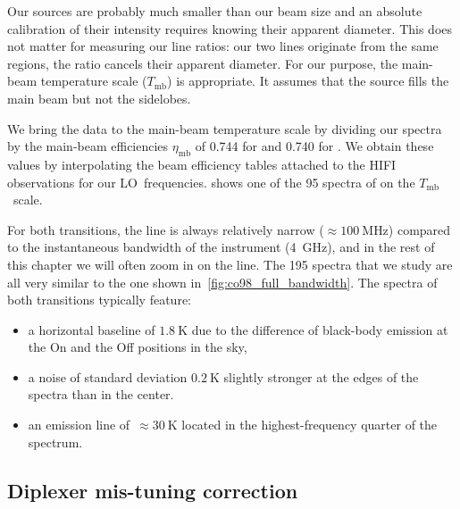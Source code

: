 Our sources are probably much smaller than our beam size and an absolute calibration of their intensity requires knowing their apparent diameter.
This does not matter for measuring our line ratios:
our two lines originate from the same regions, the ratio cancels their apparent diameter.
For our purpose, the main-beam temperature scale ($T_\text{mb}$) is appropriate.
It assumes that the source fills the main beam but not the sidelobes.

We bring the data to the main-beam temperature scale by dividing our spectra by the main-beam efficiencies $\eta_\text{mb}$ of
\num{0.744} for  and \num{0.740} for .
We obtain these values by interpolating the beam efficiency tables attached to the HIFI observations for our LO~frequencies.
 shows one of the 95 spectra of  on the $T_\text{mb}$~scale.

For both transitions, the  line is always relatively narrow ($\approx \SI{100}{\mega\hertz}$) compared to the instantaneous bandwidth of the instrument (\SI{4}{\giga\hertz}), and in the rest of this chapter we will often zoom in on the line.
The 195 spectra that we study are all very similar to the one shown in~\cref{fig:co98_full_bandwidth}.
The spectra of both transitions typically feature:
\begin{itemize}[noitemsep,nolistsep]
    \item a horizontal baseline of $\SI{1.8}{\kelvin}$ due to the difference of black-body emission at the On and the Off positions in the sky,
    \item a noise of standard deviation $\SI{0.2}{\kelvin}$ slightly stronger at the edges of the spectra than in the center.
    \item an emission line of~$\approx \SI{30}{\kelvin}$ located in the highest-frequency quarter of the spectrum.
\end{itemize}




\subsection{Diplexer mis-tuning correction}

